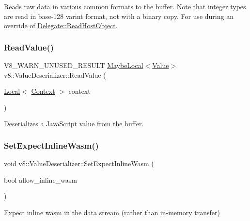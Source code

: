 Reads raw data in various common formats to the buffer. Note that integer types are read in base-\/128 varint format, not with a binary copy. For use during an override of \mbox{\hyperlink{classv8_1_1ValueDeserializer_1_1Delegate_a8b06c19cba7e80c3c5271b0a2ca88a8a}{Delegate\+::\+Read\+Host\+Object}}. \mbox{\label{classv8_1_1ValueDeserializer_ad1697f04cf0fae2f80d5750d6fe9c4da}} 
\subsubsection{\texorpdfstring{Read\+Value()}{ReadValue()}}
{\footnotesize\ttfamily V8\+\_\+\+W\+A\+R\+N\+\_\+\+U\+N\+U\+S\+E\+D\+\_\+\+R\+E\+S\+U\+LT \mbox{\hyperlink{classv8_1_1MaybeLocal}{Maybe\+Local}}$<$\mbox{\hyperlink{classv8_1_1Value}{Value}}$>$ v8\+::\+Value\+Deserializer\+::\+Read\+Value (\begin{DoxyParamCaption}\item[{\mbox{\hyperlink{classv8_1_1Local}{Local}}$<$ \mbox{\hyperlink{classv8_1_1Context}{Context}} $>$}]{context }\end{DoxyParamCaption})}

Deserializes a Java\+Script value from the buffer. \mbox{\label{classv8_1_1ValueDeserializer_a2e393ea834f217238fc144f48fd5caf1}} 
\subsubsection{\texorpdfstring{Set\+Expect\+Inline\+Wasm()}{SetExpectInlineWasm()}}
{\footnotesize\ttfamily void v8\+::\+Value\+Deserializer\+::\+Set\+Expect\+Inline\+Wasm (\begin{DoxyParamCaption}\item[{bool}]{allow\+\_\+inline\+\_\+wasm }\end{DoxyParamCaption})}

Expect inline wasm in the data stream (rather than in-\/memory transfer) \mbox{\label{classv8_1_1ValueDeserializer_a076d92b67d68c64404f1065d0dcd85b6}} 
